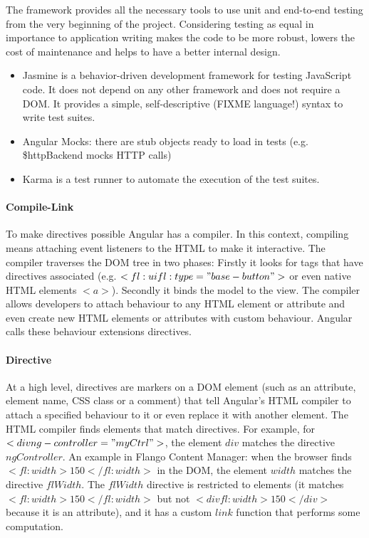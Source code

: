 The framework provides all the necessary tools to use unit and end-to-end testing from the very beginning of the project.
Considering testing as equal in importance to application writing makes the code to be more robust, lowers the cost of maintenance and helps to have a better internal design.
\begin{itemize}
    \item Jasmine is a behavior-driven development framework for testing JavaScript code. It does not depend on any other framework and does not require a \ac{DOM}. It provides a simple, self-descriptive (FIXME language!) syntax to write test suites.
    \item Angular Mocks: there are stub objects ready to load in tests (e.g. \$httpBackend mocks \ac{HTTP} calls)
    \item Karma is a test runner to automate the execution of the test suites. 
\end{itemize}
    
\paragraph{Compile-Link} To make directives possible Angular has a compiler.
In this context, compiling means attaching event listeners to the \ac{HTML} to make it interactive.
The compiler traverses the \ac{DOM} tree in two phases:
Firstly it looks for tags that have directives associated (e.g. $<fl:ui fl:type="base-button">$ or even native \ac{HTML} elements $<a>$).
Secondly it binds the model to the view.
The compiler allows developers to attach behaviour to any \ac{HTML} element or attribute and even create new HTML elements or attributes with custom behaviour. Angular calls these behaviour extensions directives.

\paragraph{Directive} At a high level, directives are markers on a \ac{DOM} element (such as an attribute, element name, \ac{CSS} class or a comment) that tell Angular's \ac{HTML} compiler to attach a specified behaviour to it or even replace it with another element.
The \ac{HTML} compiler finds elements that match directives. 
For example, for $<div ng-controller="myCtrl">$, the element $div$ matches the directive $ngController$.
An example in Flango Content Manager: when the browser finds $<fl:width>150</fl:width>$ in the \ac{DOM}, the element $width$ matches the directive $flWidth$.
The $flWidth$ directive is restricted to elements (it matches $<fl:width>150</fl:width>$ but not $<div fl:width>150</div>$ because it is an attribute), and it has a custom $link$ function that performs some computation.

